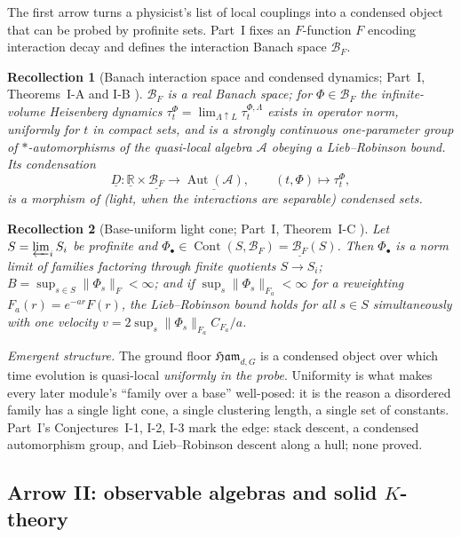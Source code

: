\documentclass[12pt]{article}
\newcommand{\cond}[1]{\underline{#1}}          %
\newcommand{\Cont}{\operatorname{Cont}}        %
\newcommand{\Ffun}{F}                          %
\newcommand{\BF}{\mathcal{B}_{F}}              %
\newcommand{\Ham}{\mathfrak{Ham}}              %
\newcommand{\RR}{\mathbb{R}}
\newcommand{\qA}{\mathcal{A}}                  %
\newcommand{\Aut}{\operatorname{Aut}}
\newcommand{\norm}[1]{\lVert #1 \rVert}
\theoremstyle{plain}
\newtheorem{recollection}[recollection]{Recollection}
\theoremstyle{definition}
\theoremstyle{remark}
\begin{document}
The first arrow turns a physicist's list of local couplings into a condensed object
that can be probed by profinite sets. Part~I fixes an $\Ffun$-function $\Ffun$ encoding
interaction decay and defines the interaction Banach space $\BF$.

\begin{recollection}[Banach interaction space and condensed dynamics; Part~I, Theorems~I-A and I-B \cite{paperLocality}]
\label{rec:I}
$\BF$ is a real Banach space; for $\Phi\in\BF$ the infinite-volume Heisenberg dynamics
$\tau^\Phi_t=\lim_{\Lambda\uparrow L}\tau^{\Phi,\Lambda}_t$ exists in operator norm,
uniformly for $t$ in compact sets, and is a strongly continuous one-parameter group of
$\ast$-automorphisms of the quasi-local algebra $\qA$ obeying a Lieb--Robinson bound. Its
condensation
\[
\cond{D}:\cond{\RR}\times\cond{\BF}\longrightarrow\cond{\Aut(\qA)},
\qquad (t,\Phi)\mapsto\tau^\Phi_t,
\]
is a morphism of (light, when the interactions are separable) condensed sets.
\end{recollection}

\begin{recollection}[Base-uniform light cone; Part~I, Theorem~I-C \cite{paperLocality}]
\label{rec:Ic}
Let $S=\varprojlim_i S_i$ be profinite and $\Phi_\bullet\in\Cont(S,\BF)=\cond{\BF}(S)$.
Then $\Phi_\bullet$ is a norm limit of families factoring through finite quotients
$S\to S_i$; $B=\sup_{s\in S}\norm{\Phi_s}_\Ffun<\infty$; and if
$\sup_{s}\norm{\Phi_s}_{\Ffun_a}<\infty$ for a reweighting $\Ffun_a(r)=e^{-ar}\Ffun(r)$,
the Lieb--Robinson bound holds for all $s\in S$ simultaneously with one velocity
$v=2\sup_s\norm{\Phi_s}_{\Ffun_a}C_{\Ffun_a}/a$.
\end{recollection}

\emph{Emergent structure.} The ground floor $\Ham_{d,G}$ is a condensed object over
which time evolution is quasi-local \emph{uniformly in the probe}. Uniformity is what
makes every later module's ``family over a base'' well-posed: it is the reason a
disordered family has a single light cone, a single clustering length, a single set of
constants. Part~I's Conjectures~I-1, I-2, I-3 mark the edge: stack descent, a condensed
automorphism group, and Lieb--Robinson descent along a hull; none proved.

\subsection{Arrow II: observable algebras and solid \texorpdfstring{$K$}{K}-theory}
\label{sec:arrowII}
\end{document}
